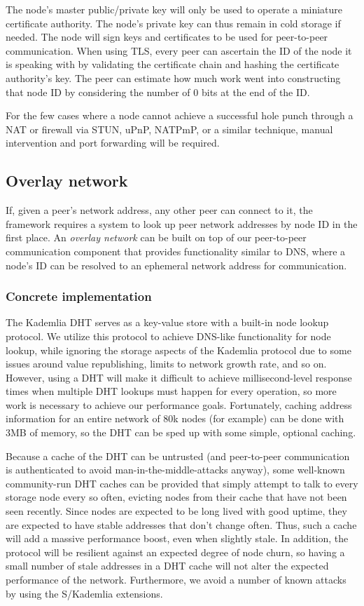 \documentclass[a4paper,10pt]{article}
\begin{document}
The node's master public/private key will only be used to operate a miniature
certificate authority. The node's private key can thus remain in cold storage
if needed. The node will sign keys and certificates to be used for peer-to-peer
communication. When using TLS, every peer can ascertain the ID of the node it
is speaking with by validating the certificate chain and hashing the certificate
authority's key. The peer can estimate how much work went into
constructing that node ID by considering the number of 0 bits at the end of the ID.

For the few cases where a node cannot achieve a successful hole punch through a
NAT or firewall via STUN, uPnP, NATPmP, or a similar technique, manual
intervention and port forwarding will be required.

\subsection{Overlay network}

If, given a peer's network address, any other peer can connect to it, the
framework requires a system to look up peer network addresses by node ID in
the first place. An {\em overlay network} can be built on top of our peer-to-peer communication
component that provides functionality similar to DNS, where a node's ID can be
resolved to an ephemeral network address for communication.

\subsubsection{Concrete implementation}

The Kademlia DHT serves as a key-value store with a built-in node lookup protocol. We utilize this protocol to achieve DNS-like functionality for node lookup, while ignoring the storage aspects of the Kademlia protocol due to some issues around value republishing, limits to network growth rate,
and so on. However, using a DHT will make it difficult to achieve millisecond-level response times when multiple DHT lookups must happen for every operation, so more work is necessary to achieve our performance goals. Fortunately, caching address information for an entire network of 80k nodes (for example) can be done with 3MB of memory, so the DHT can be sped up with some simple, optional
caching.

Because a cache of the DHT can be untrusted (and peer-to-peer
communication is authenticated to avoid man-in-the-middle-attacks anyway),
some well-known community-run DHT caches can be provided that simply attempt to
talk to every storage node every so often, evicting nodes from their cache that
have not been seen recently. Since nodes are expected to be long lived with
good uptime, they are expected to have stable addresses that don't change
often. Thus, such a cache will add a massive performance boost, even when slightly stale. In addition, the protocol will be resilient against an expected degree of node churn, so having a small number of stale addresses in a DHT cache will not alter the expected performance of the network. Furthermore, we avoid a number of known attacks by using the S/Kademlia extensions.
\end{document}
